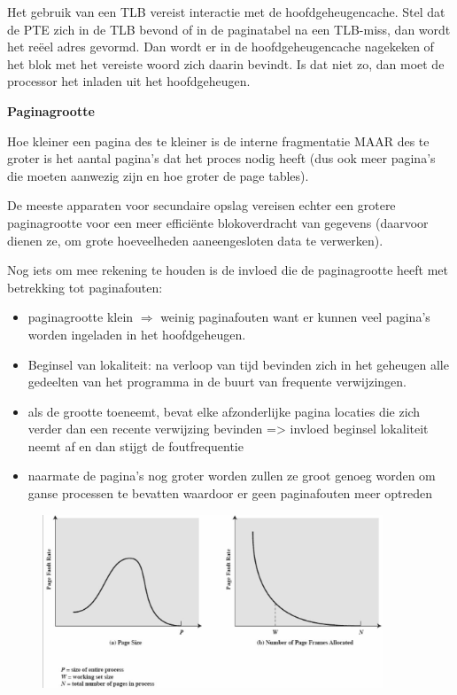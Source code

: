 Het gebruik van een TLB vereist interactie met de hoofdgeheugencache. Stel dat de PTE zich in de TLB bevond of in de paginatabel na een TLB-miss, dan wordt het reëel adres gevormd. Dan wordt er in de hoofdgeheugencache nagekeken of het blok met het vereiste woord zich daarin bevindt. Is dat niet zo, dan moet de processor het inladen uit het hoofdgeheugen.

\textbf{Paginagrootte}

Hoe kleiner een pagina des te kleiner is de interne fragmentatie MAAR des te groter is het aantal pagina's dat het proces nodig heeft (dus ook meer pagina's die moeten aanwezig zijn en hoe groter de page tables).

De meeste apparaten voor secundaire opslag vereisen echter een grotere paginagrootte voor een meer efficiënte blokoverdracht van gegevens (daarvoor dienen ze, om grote hoeveelheden aaneengesloten data te verwerken).

Nog iets om mee rekening te houden is de invloed die de paginagrootte heeft met betrekking tot paginafouten:

\begin{itemize}
\item paginagrootte klein $\Rightarrow$ weinig paginafouten want er kunnen veel pagina's worden ingeladen in het hoofdgeheugen.
\item Beginsel van lokaliteit: na verloop van tijd bevinden zich in het geheugen alle gedeelten van het programma in de buurt van frequente verwijzingen.
\item als de grootte toeneemt, bevat elke afzonderlijke pagina locaties die zich verder dan een recente verwijzing bevinden => invloed beginsel lokaliteit neemt af en dan stijgt de foutfrequentie
\item naarmate de pagina's nog groter worden zullen ze groot genoeg worden om ganse processen te bevatten waardoor er geen paginafouten meer optreden
\end{itemize}

\begin{figure}[htp]
    \centering
            \includegraphics[width=4in]{img/paginagrootte}
        \caption{}
    \label{fig:}
\end{figure}

